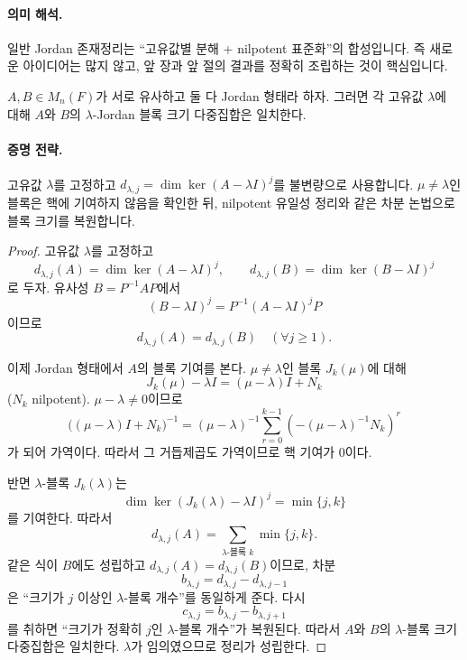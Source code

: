 \paragraph{의미 해석.}
일반 Jordan 존재정리는 ``고유값별 분해 + nilpotent 표준화''의 합성입니다. 즉 새로운 아이디어는 많지 않고, 앞 장과 앞 절의 결과를 정확히 조립하는 것이 핵심입니다.

\begin{theorem}
$A,B\in M_n(F)$가 서로 유사하고 둘 다 Jordan 형태라 하자. 그러면 각 고유값 $\lambda$에 대해 $A$와 $B$의 $\lambda$-Jordan 블록 크기 다중집합은 일치한다.
\end{theorem}

\paragraph{증명 전략.}
고유값 $\lambda$를 고정하고 $d_{\lambda,j}=\dim\ker(A-\lambda I)^j$를 불변량으로 사용합니다. $\mu\neq\lambda$인 블록은 핵에 기여하지 않음을 확인한 뒤, nilpotent 유일성 정리와 같은 차분 논법으로 블록 크기를 복원합니다.

\begin{proof}
고유값 $\lambda$를 고정하고
$$
d_{\lambda,j}(A)=\dim\ker(A-\lambda I)^j,\qquad
d_{\lambda,j}(B)=\dim\ker(B-\lambda I)^j
$$
로 두자. 유사성 $B=P^{-1}AP$에서
$$
(B-\lambda I)^j=P^{-1}(A-\lambda I)^jP
$$
이므로
$$
d_{\lambda,j}(A)=d_{\lambda,j}(B)\quad(\forall j\ge1).
$$

이제 Jordan 형태에서 $A$의 블록 기여를 본다. $\mu\neq\lambda$인 블록 $J_k(\mu)$에 대해
$$
J_k(\mu)-\lambda I=(\mu-\lambda)I+N_k
$$
($N_k$ nilpotent). $\mu-\lambda\neq0$이므로
$$
\big((\mu-\lambda)I+N_k\big)^{-1}
=(\mu-\lambda)^{-1}\sum_{r=0}^{k-1}\left(-(\mu-\lambda)^{-1}N_k\right)^r
$$
가 되어 가역이다. 따라서 그 거듭제곱도 가역이므로 핵 기여가 0이다.

반면 $\lambda$-블록 $J_{k}(\lambda)$는
$$
\dim\ker(J_k(\lambda)-\lambda I)^j=\min\{j,k\}
$$
를 기여한다. 따라서
$$
d_{\lambda,j}(A)=\sum_{\text{$\lambda$-블록 }k}\min\{j,k\}.
$$
같은 식이 $B$에도 성립하고 $d_{\lambda,j}(A)=d_{\lambda,j}(B)$이므로, 차분
$$
b_{\lambda,j}=d_{\lambda,j}-d_{\lambda,j-1}
$$
은 ``크기가 $j$ 이상인 $\lambda$-블록 개수''를 동일하게 준다. 다시
$$
c_{\lambda,j}=b_{\lambda,j}-b_{\lambda,j+1}
$$
를 취하면 ``크기가 정확히 $j$인 $\lambda$-블록 개수''가 복원된다. 따라서 $A$와 $B$의 $\lambda$-블록 크기 다중집합은 일치한다. $\lambda$가 임의였으므로 정리가 성립한다.
\end{proof}

